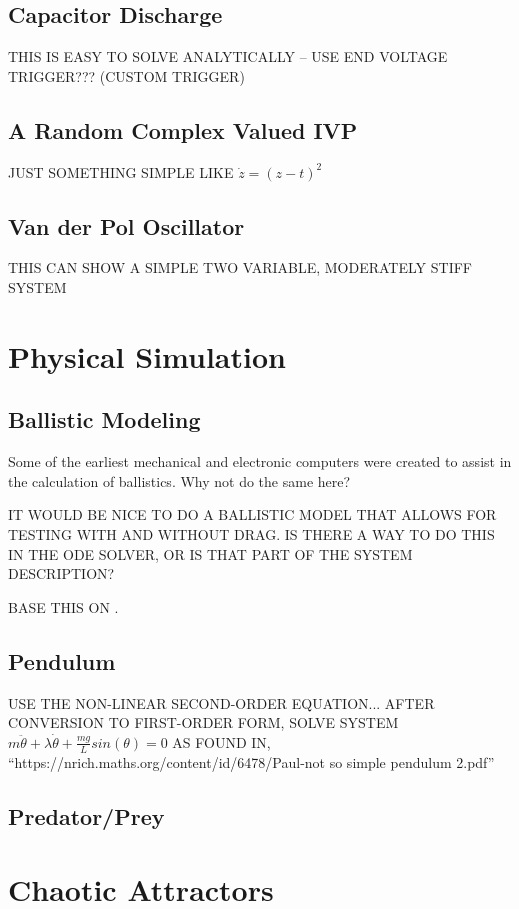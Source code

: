 \documentclass[letterpaper,10pt]{book}
\begin{document}
    \section{Capacitor Discharge}
      THIS IS EASY TO SOLVE ANALYTICALLY -- USE END VOLTAGE TRIGGER??? (CUSTOM TRIGGER)

    \section{A Random Complex Valued IVP}
      JUST SOMETHING SIMPLE LIKE $\dot{z} = (z - t)^{2}$

    \section{Van der Pol Oscillator}
      THIS CAN SHOW A SIMPLE TWO VARIABLE, MODERATELY STIFF SYSTEM

  \chapter{Physical Simulation}
    \section{Ballistic Modeling}
      Some of the earliest mechanical and electronic computers were created to assist in the calculation of ballistics.  Why not do the same here?
      
      IT WOULD BE NICE TO DO A BALLISTIC MODEL THAT ALLOWS FOR TESTING WITH AND WITHOUT DRAG.  IS THERE A WAY TO DO THIS IN THE ODE SOLVER, OR IS THAT PART OF THE SYSTEM DESCRIPTION?
      
      BASE THIS ON \cite{wade2011going}.

    \section{Pendulum}
      USE THE NON-LINEAR SECOND-ORDER EQUATION... AFTER CONVERSION TO FIRST-ORDER FORM, SOLVE SYSTEM
      $m\ddot{\theta} + \lambda\dot{\theta} + \frac{m g}{L}sin(\theta) = 0$
      AS FOUND IN, ``https://nrich.maths.org/content/id/6478/Paul-not so simple pendulum 2.pdf''

    \section{Predator/Prey}
  
  \chapter{Chaotic Attractors}
\end{document}
